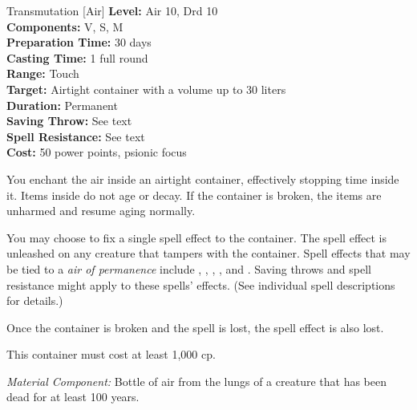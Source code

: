 {Transmutation [Air]}
{
    \textbf{Level:}
    Air 10, Drd 10\\
    \textbf{Components:}
    V, S, M\\
    \textbf{Preparation Time:}
    30 days\\
    \textbf{Casting Time:}
    1 full round\\
    \textbf{Range:}
    Touch\\
    \textbf{Target:}
    Airtight container with a volume up to 30 liters\\
    \textbf{Duration:}
    Permanent\\
    \textbf{Saving Throw:}
    See text\\
    \textbf{Spell Resistance:}
    See text\\
    \textbf{Cost:}
    50 power points, psionic focus\\
}
{
    You enchant the air inside an airtight container, effectively stopping time inside it. Items inside do not age or decay. If the container is broken, the items are unharmed and resume aging normally.

    You may choose to fix a single spell effect to the container. The spell effect is unleashed on any creature that tampers with the container. Spell effects that may be tied to a \emph{air of permanence} include , , , , and . Saving throws and spell resistance might apply to these spells' effects. (See individual spell descriptions for details.)

    Once the container is broken and the spell is lost, the spell effect is also lost.

    This container must cost at least 1,000 cp.

    \textit{Material Component:} Bottle of air from the lungs of a creature that has been dead for at least 100 years.
}

